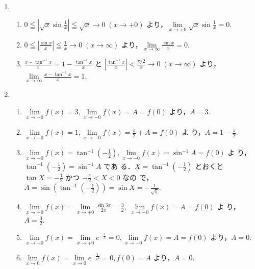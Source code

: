 \documentclass[11pt, uplatex, dvipdfmx, twoside]{jsarticle}
\renewcommand{\dlim}{\lim\limits} %
\begin{document}
\begin{enumerate}[label=\ref{sec:limit}.\arabic*]

  \setlength{\itemsep}{1ex}
  
\item
  \begin{enumerate}[label=(\arabic*)]
    \setlength{\itemsep}{1ex}
    
  \item
    $0 \leqq \left| \sqrt{x}\sin \frac{1}{x}\right| \leqq \sqrt{x} \to
    0 \; (x \to +0)$ より，$\dlim_{x \to +0} \sqrt{x} \sin \frac{1}{x} =0$.
    
  \item
    $0 \leqq \left| \frac{\sin x}{x} \right| \leqq \frac{1}{x} \to 0
    \; (x \to \infty)$ より，$\dlim_{x \to \infty} \frac{\sin x}{x}=0$.

  \item $\frac{x-\tan^{-1}{x}}{x} = 1 -\frac{\tan^{-1}x}{x}$
    と $\left|\frac{\tan^{-1}x}{x}\right| <
    \frac{\pi/2}{x} \to 0 \; ( x \to \infty)$
    より，$\dlim_{x \to \infty}\frac{x-\tan^{-1}x}{x}=1$.
  \end{enumerate}

\item 
  \begin{enumerate}[label=(\arabic*)]
    \setlength{\itemsep}{1ex}
    
  \item
    $\dlim_{x \to +0} f(x)= 3, \dlim_{x \to -0} f(x) = A =
    f(0)$ より，$A=3$.

  \item
    $\dlim_{x \to +0} f(x)  =1,
    \dlim_{x \to -0} f(x) = \frac{\pi}{2} +A = f(0)$ よ
    り，$A=1-\frac{\pi}{2}$.

  \item
    $\dlim_{x \to +0} f(x) = \tan^{-1}\left(-\frac{1}{2}\right),
    \dlim_{x \to -0} f(x) = \sin^{-1} A = f(0)$ よ
    り，$\tan^{-1}\left(-\frac{1}{2}\right) = \sin^{-1}A$ であ
    る．$X=\tan^{-1}\left(-\frac{1}{2}\right)$ とおくと
    $\tan X = -\frac{1}{2}$ かつ $-\frac{\pi}{2} < X < 0$ なの
    で，$A=\sin \left(\tan^{-1}\left(-\frac{1}{2}\right)\right) = \sin
    X = -\frac{1}{\sqrt{5}}$.

  \item
    $\dlim_{x \to +0} f(x) = \dlim_{x \to +0} \frac{\sin
      3x}{2x}=\frac{3}{2}, \; \dlim_{x \to -0} f(x) = A = f(0)$ よ
    り，$A=\frac{3}{2}$.

  \item
    $\dlim_{x \to +0} f(x) = \dlim_{x \to +0} e^{-\frac{1}{x}} = 0,
    \dlim_{x \to -0} f(x) = A = f(0)$ より，$A=0$.

  \item $\dlim_{x \to 0} f(x) = \dlim_{x \to 0} e^{-\frac{1}{x^2}} = 0, f(0)=A$ より，$A=0$.
  \end{enumerate}

\end{enumerate}
\end{document}
